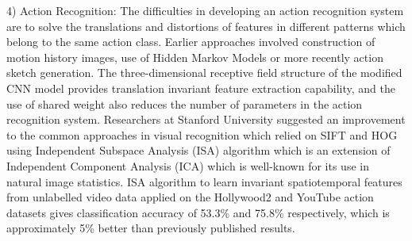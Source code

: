 \documentclass[12pt]{article}
\begin{document}
4) Action Recognition: The difficulties in developing an
action recognition system are to solve the translations and
distortions of features in different patterns which belong to
the same action class. Earlier approaches involved
construction of motion history images, use of Hidden
Markov Models or more recently action sketch generation.
The three-dimensional receptive field structure of the
modified CNN model  provides translation invariant
feature extraction capability, and the use of shared weight
also reduces the number of parameters in the action
recognition system. Researchers at Stanford University
suggested an improvement to the common approaches in
visual recognition which relied on SIFT and HOG
using Independent Subspace Analysis (ISA) algorithm
which is an extension of Independent Component Analysis
(ICA) which is well-known for its use in natural image
statistics. ISA algorithm to learn invariant spatiotemporal features from unlabelled video data applied on the
Hollywood2 and YouTube action datasets gives
classification accuracy of 53.3\% and 75.8\% respectively, which is approximately 5\% better than
previously published results.
\end{document}

